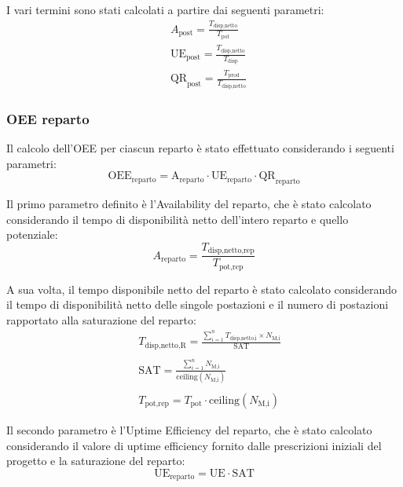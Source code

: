 \documentclass[11pt]{article}
\begin{document}
\noindent
I vari termini sono stati calcolati a partire dai seguenti parametri:
\begin{equation}
    \begin{aligned}
        & A_\text{post}  = \frac{T_\text{disp,netto}}{T_\text{pot}} \\
        & \text{UE}_\text{post} = \frac{T_\text{disp,netto}}{T_\text{disp}} \\
        & \text{QR}_\text{post} = \frac{T_\text{prod}}{T_\text{disp,netto}}
    \end{aligned}
\end{equation}

\subsubsection{OEE reparto}
Il calcolo dell'OEE per ciascun reparto è stato effettuato considerando i seguenti parametri:
\begin{equation}
    \text{OEE}_\text{reparto} = \text{A}_\text{reparto} \cdot \text{UE}_\text{reparto} \cdot \text{QR}_\text{reparto}
\end{equation}

Il primo parametro definito è l'Availability del reparto, che è stato calcolato considerando il tempo di disponibilità netto dell'intero reparto e quello potenziale:
\begin{equation}
    A_\text{reparto} = \frac{T_\text{disp,netto,rep}}{T_\text{pot,rep}}
\end{equation}

A sua volta, il tempo disponibile netto del reparto è stato calcolato considerando il tempo di disponibilità netto delle singole postazioni e il numero di postazioni rapportato alla saturazione del reparto:
\begin{equation}
    \begin{aligned}
        & T_\text{disp,netto,R} = \frac{\sum_{i=1}^{n} T_\text{disp,netto,i} \times N_\text{M,i}}{\text{SAT}}  \\\ \\
        & \text{SAT} = \frac{\sum_{i=1}^{n} N_\text{M,i}}{\text{ceiling}(N_\text{M,i})} \\\ \\
        & T_\text{pot,rep} = T_\text{pot} \cdot \text{ceiling}(N_\text{M,i})
    \end{aligned}
\end{equation}

Il secondo parametro è l'Uptime Efficiency del reparto, che è stato calcolato considerando il valore di uptime efficiency fornito dalle prescrizioni iniziali del progetto e la saturazione del reparto:
\begin{equation}
    \text{UE}_\text{reparto} = \text{UE} \cdot \text{SAT}
\end{equation}
\end{document}
